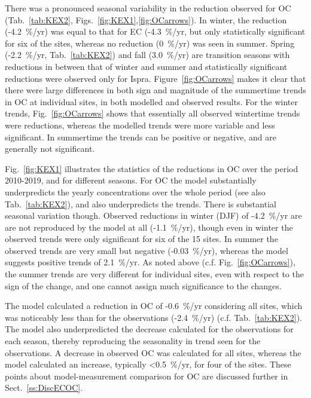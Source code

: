 
There was a pronounced seasonal variability in the reduction observed for
OC (Tab.~\ref{tab:KEX2}, Figs.~\ref{fig:KEX1},\ref{fig:OCarrows}). In winter, the
 reduction (-4.2~\%/yr) was equal to that for
EC (-4.3~\%/yr, but only statistically significant for six of the sites,
whereas no reduction (0~\%/yr) was seen in summer. Spring (-2.2~\%/yr, Tab.~\ref{tab:KEX2}) and fall (3.0~\%/yr) are transition seasons with reductions in between
that of winter and summer and statistically significant reductions were
observed only for Ispra. 
%
Figure~\ref{fig:OCarrows} makes it clear that there were large differences in both sign and magnitude of the summertime trends in OC at individual sites, in both modelled and observed results. For the winter trends, Fig.~\ref{fig:OCarrows} shows that essentially all observed wintertime trends were reductions, whereas the modelled trends were more variable and less significant. In summertime the trends can be positive or negative, and are generally not significant.


Fig.~\ref{fig:KEX1} illustrates the statistics of the reductions in OC  over the period 2010-2019, and for different seasons. For OC the model substantially underpredicts the yearly concentrations over the whole period (see also Tab.~\ref{tab:KEX2}), and also underpredicts the trends. There is substantial seasonal variation though. Observed reductions in winter (DJF) of -4.2~\%/yr are are not reproduced by the model at all (-1.1~\%/yr), though even in winter the observed trends were only significant for six of the 15 sites. In summer the observed trends are very small but negative (-0.03~\%/yr), whereas the model suggests positive trends of 2.1~\%/yr. As noted above (c.f. Fig.~\ref{fig:OCarrows}), the summer trends are very different for individual sites, even with respect to the sign of the change, and one cannot assign much significance to the changes. 

The model calculated a
reduction in OC of -0.6~\%/yr considering all sites, which was noticeably
less than for the observations (-2.4~\%/yr) (c.f. Tab.~\ref{tab:KEX2}). The model also underpredicted
the decrease calculated for the observations for each season, thereby
reproducing the seasonality in trend seen for the observations. A decrease
in observed OC was calculated for all sites, whereas the model calculated
an increase, typically <0.5~\%/yr, for four of the sites. These points about model-measurement comparison for OC are discussed further in Sect.~\ref{ss:DiscECOC}.


